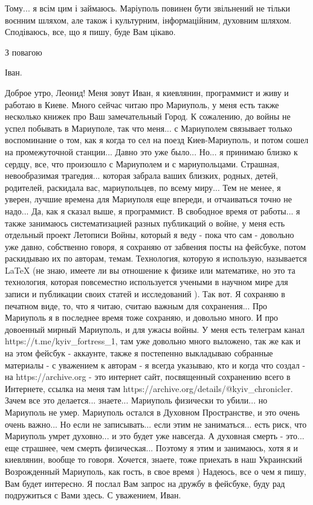Тому... я всім цим і займаюсь. Маріуполь повинен бути звільнений не тільки
воєнним шляхом, але також і культурним, інформаційним, духовним шляхом.
Сподіваюсь, все, що я пишу, буде Вам цікаво. 


З повагою

Іван.

Доброе утро, Леонид! Меня зовут Иван, я киевлянин, программист и живу и работаю
в Киеве. Много сейчас читаю про Мариуполь, у меня есть также несколько книжек
про Ваш замечательный Город. К сожалению, до войны не успел побывать в
Мариуполе, так что меня... с Мариуполем связывает только воспоминание о том,
как я когда то сел на поезд Киев-Мариуполь, и потом сошел на промежуточной
станции... Давно это уже было... Но... я принимаю близко к сердцу, все, что
произошло с Мариуполем и с мариупольцами. Страшная, невообразимая трагедия...
которая забрала ваших близких, родных, детей, родителей, раскидала вас,
мариупольцев, по всему миру... Тем не менее, я уверен, лучшие времена для
Мариуполя еще впереди, и отчаиваться точно не надо... Да, как я сказал выше, я
программист. В свободное время от работы... я также занимаюсь систематизацией
разных публикаций о войне, у меня есть отдельный проект Летописи Войны, который
я веду - пока что сам - довольно уже давно, собственно говоря, я сохраняю от
забвения посты на фейсбуке, потом раскидываю их по авторам, темам. Технология,
которую я использую, называется LaTeX (не знаю, имеете ли вы отношение к физике
или математике, но это та технология, которая повсеместно используется учеными
в научном мире для записи и публикации своих статей и исследований ). Так вот.
Я сохраняю в печатном виде, то, что я читаю, считаю важным для сохранения...
Про Мариуполь я в последнее время тоже сохраняю, и довольно много. И про
довоенный мирный Мариуполь, и для ужасы войны. У меня есть телеграм канал
https://t.me/kyiv_fortress_1, там уже довольно много выложено, так же как и на
этом фейсбук - аккаунте, также я постепенно выкладываю собранные  материалы - с
уважением к авторам - я всегда указываю, кто и когда что создал - на
https://archive.org - это интернет сайт, посвященный сохранению всего в
Интернете, ссылка на меня там https://archive.org/details/@kyiv_chronicler.
Зачем все это делается... знаете... Мариуполь физически то убили... но
Мариуполь не умер. Мариуполь остался в Духовном Пространстве, и это очень очень
важно... Но если не записывать... если этим не заниматься... есть риск, что
Мариуполь умрет духовно... и это будет уже навсегда. А духовная смерть - это...
еще страшнее, чем смерть физическая... Поэтому я этим и занимаюсь, хотя я и
киевлянин, вообще то говоря. Хочется, знаете, тоже приехать в наш Украинский
Возрожденный Мариуполь, как гость, в свое время ) Надеюсь, все о чем я пишу,
Вам будет интересно. Я послал Вам запрос на дружбу в фейсбуке, буду рад
подружиться с Вами здесь. С уважением, Иван.

